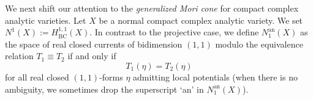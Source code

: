 \documentclass[11pt]{amsart}
\numberwithin{equation}{section}
\def\bbeta{\boldsymbol{\beta}}
\theoremstyle{definition}
\theoremstyle{definition}
\newtheorem{theorem}{Theorem}[section]
\theoremstyle{definition}
\begin{document}


We next shift our attention to the \emph{generalized Mori cone} for compact complex analytic varieties. Let $X$ be a normal compact complex analytic variety. We set $N^1(X):= H^{1,1}_{\mathrm{BC}}(X)$. 
In contrast to the projective case, we define  $N_1^{\mathrm{an}}(X)$ as the space of real closed currents of bidimension $(1,1)$ modulo the equivalence relation $T_1 \equiv T_2$ if and only if
$$
T_1(\eta) = T_2(\eta)
$$
for all real closed $(1,1)$-forms $\eta$ admitting local potentials (when there is no ambiguity, we sometimes drop the superscript `an' in $N_1^{\text{an}}(X)$). 
\end{document}
